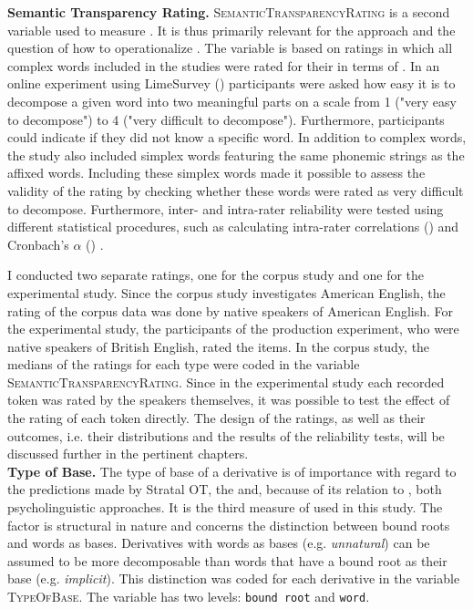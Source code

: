 \textbf{Semantic Transparency Rating.} \textsc{SemanticTransparencyRating} is a second variable used to measure . It is thus primarily relevant for the  approach and the question of how to operationalize .  
 The variable is based on ratings in which all complex words included in the studies were rated for their  in terms of .
  In an online experiment using LimeSurvey (\citealt{LimeSurveyProjectTeam.2015}) participants  were asked how easy it is to decompose a given word into two meaningful parts on a scale from 1 ("very easy to decompose") to 4 ("very difficult to decompose"). Furthermore, participants could indicate if they did not know a specific word. In addition to complex words, the study also included simplex words featuring the same phonemic strings as the affixed words. Including these simplex words made it possible to assess the validity of the rating by checking whether these words were rated as very difficult to decompose. Furthermore, inter- and intra-rater reliability were tested using different statistical procedures, such as calculating intra-rater correlations (\citealt{Bartko.1966}) and Cronbach's $\alpha$ (\citealt{Cronbach.1951}) . 

I conducted two separate ratings, one for the corpus study and one for the experimental study. Since the corpus study investigates American English, the rating of the corpus data was done by native speakers of American English. For the experimental study, the participants of the production experiment, who were native speakers of British English, rated the items. 
In the corpus study, the medians of the ratings for each type were coded in the variable \textsc{SemanticTransparencyRating}. Since in the experimental study each recorded token was rated by the speakers themselves, it was possible to test the effect of the rating of each token directly.
The design of the ratings, as well as their outcomes, i.e. their distributions and the results of the reliability tests, will be discussed further in the pertinent chapters. \\


\textbf{Type of Base.} The type of base of a derivative is of importance with regard to the predictions made by Stratal OT, the  and, because of its relation to , both psycholinguistic approaches. It is
the third measure of  used in this study. The factor is structural in nature and concerns the distinction between bound roots and words as bases. Derivatives with words as bases  (e.g. \textit{unnatural}) can be assumed to be more decomposable than words that have a bound root as their base  (e.g. \textit{implicit}). This distinction was coded for each derivative in the variable \textsc{TypeOfBase}. The variable has two levels: \texttt{bound root} and \texttt{word}. \\


